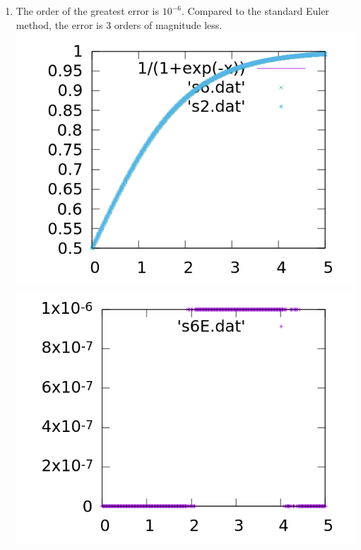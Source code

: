 \documentclass[12pt, letterpaper]{article}
\begin{document}
\begin{enumerate}
		\item The order of the greatest error is $10^{-6}$.  Compared to the standard Euler method, the error is 3 orders of magnitude less.\\
		\includegraphics[scale=1]{s6solu.png}
		\includegraphics[scale=1]{s6err.png}
	\end{enumerate}
\end{document}
